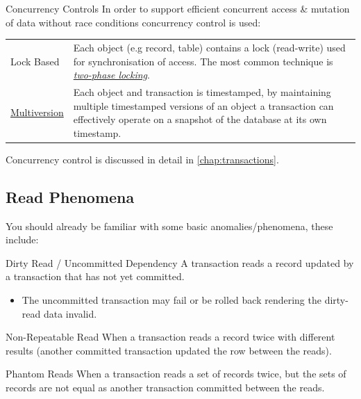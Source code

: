\begin{sidenotebox}{Concurrency Controls}
    In order to support efficient concurrent access \& mutation of data without race conditions concurrency control is used:
    \begin{center}
        \begin{tabular}{l p{}}
            Lock Based                                                                          & Each object (e.g record, table) contains a lock (read-write) used for synchronisation of access. The most common technique is \href{https://en.wikipedia.org/wiki/Two-phase_locking}{\textit{two-phase locking}}. \\
            \href{https://en.wikipedia.org/wiki/Multiversion_concurrency_control}{Multiversion} & Each object and transaction is timestamped, by maintaining multiple timestamped versions of an object a transaction can effectively operate on a snapshot of the database at its own timestamp.                   \\
        \end{tabular}
    \end{center}
    Concurrency control is discussed in detail in \autoref{chap:transactions}.
\end{sidenotebox}

\subsection{Read Phenomena}
You should already be familiar with some basic anomalies/phenomena, these include:
\begin{definitionbox}{Dirty Read / Uncommitted Dependency}
    A transaction reads a record updated by a transaction that has not yet committed.
    \begin{itemize}
        \item The uncommitted transaction may fail or be rolled back rendering the dirty-read data invalid.
    \end{itemize}
\end{definitionbox}
\begin{tcbraster}[raster columns=2, raster equal height]
    \begin{definitionbox}{Non-Repeatable Read}
        When a transaction reads a record twice with different results (another committed transaction updated the row between the reads).
    \end{definitionbox}
    \begin{definitionbox}{Phantom Reads}
        When a transaction reads a set of records twice, but the sets of records are not equal as another transaction committed between the reads.
    \end{definitionbox}
\end{tcbraster}
